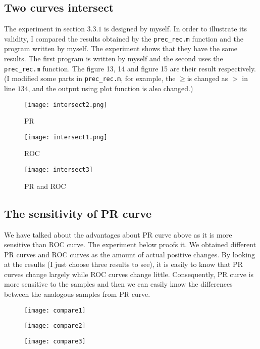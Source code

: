 \documentclass[a4paper,12pt]{article}
\begin{document}
\subsection{Two curves intersect}

The experiment in section $3.3.1$ is designed by myself. In order to illustrate its validity, I compared the results obtained by the \verb|prec_rec.m| function and the program written by myself. The experiment shows that they have the same results. The first program is written by myself and the second uses the \verb|prec_rec.m| function. The figure 13, 14 and figure 15 are their result respectively. (I modified some parts in \verb|prec_rec.m|, for example, the $\ge$is changed as $>$ in line $134$, and the output using plot function is also changed.)




\begin{figure}[!ht]
\begin{minipage}[t]{0.5\textwidth}
\texttt{[image: intersect2.png]}
\caption{PR}
\end{minipage}
\begin{minipage}[t]{0.5\textwidth}
\centering\texttt{[image: intersect1.png]}
\caption{ROC}
\end{minipage}
\end{figure}

\begin{figure}[!ht]
\centering\texttt{[image: intersect3]}
\caption{PR and ROC}
\end{figure} 

\subsection{The sensitivity of PR curve}

We have talked about the advantages about PR curve above as it is more sensitive than ROC curve. The experiment below proofs it. We obtained different PR curves and ROC curves as the amount of actual positive changes. By looking at the results (I just choose three results to see), it is easily to know that PR curves change largely while ROC curves change little. Consequently, PR curve is more sensitive to the samples and then we can easily know the differences between the analogous samples from PR curve.   


\begin{figure}[!ht]
\centering\texttt{[image: compare1]}
\end{figure} 
\begin{figure}[!ht]
\centering\texttt{[image: compare2]}
\end{figure} 
\begin{figure}[!ht]
\centering\texttt{[image: compare3]}
\end{figure} 



\end{document}
